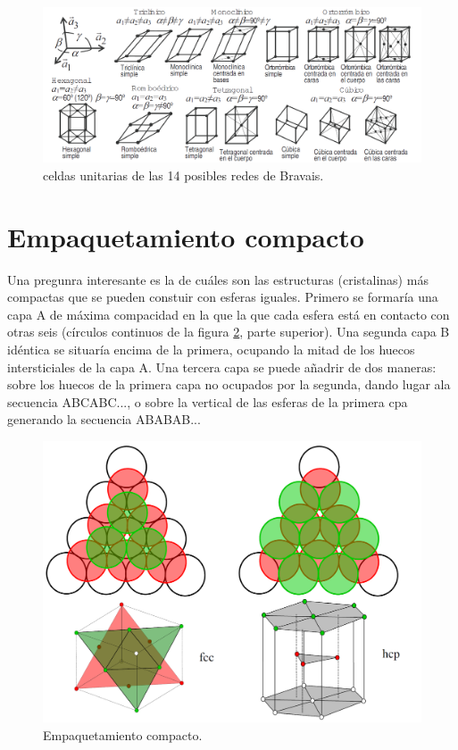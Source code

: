 \begin{figure}[h!] \centering
    \includegraphics[scale=0.7]{Cuerpo/Ch_01/Redes_bravais.png}
    \caption{celdas unitarias de las 14 posibles redes de Bravais.}
    \label{Fig:01-03}
\end{figure}

\section{Empaquetamiento compacto}

Una pregunra interesante es la de cuáles son las estructuras (cristalinas) más compactas que se pueden constuir con esferas iguales. Primero se formaría una capa A de máxima compacidad en la que la que cada esfera está en contacto con otras seis (círculos continuos de la figura \ref{Fig:01-04}, parte superior). Una segunda capa B idéntica se situaría encima de la primera, ocupando la mitad de los huecos intersticiales de la capa A. Una tercera capa se puede añadrir de dos maneras: sobre los huecos de la primera capa no ocupados por la segunda, dando lugar ala secuencia ABCABC..., o sobre la vertical de las esferas de la primera cpa generando la secuencia ABABAB...

\begin{figure}[h!] \centering
    \includegraphics[scale=0.2]{Cuerpo/Ch_01/Empaquetamiento_compacto.png}
    \caption{Empaquetamiento compacto.}
    \label{Fig:01-04}
\end{figure}

